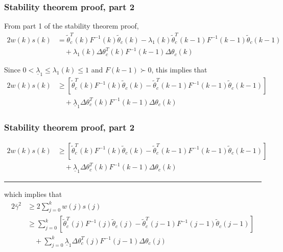 \begin{frame}
    \frametitle{Stability theorem proof, part 2}

    From part 1 of the stability theorem proof,
    \begin{align*}
        2 w(k) s(k) & = \tilde{\theta}_c^T(k) F^{-1}(k) \tilde{\theta}_c(k)
            - \lambda_1(k) \tilde{\theta}_c^T(k-1) F^{-1}(k-1) \tilde{\theta}_c(k-1) \\
        & \quad + \lambda_1(k) \Delta\theta_c^T(k) F^{-1}(k-1) \Delta\theta_c(k)
    \end{align*}
    \pause

    Since $0 < \underline{\lambda}_1 \leq \lambda_1(k) \leq 1$ and $F(k-1) \succ 0$, this implies that
    \begin{align*}
         2 w(k) s(k) & \geq \left[ \tilde{\theta}_c^T(k) F^{-1}(k) \tilde{\theta}_c(k)
            - \tilde{\theta}_c^T(k-1) F^{-1}(k-1) \tilde{\theta}_c(k-1) \right] \\
         & \quad + \underline{\lambda}_1 \Delta\theta_c^T(k) F^{-1}(k-1) \Delta\theta_c(k)
    \end{align*}
        
\end{frame}

\begin{frame}
    \frametitle{Stability theorem proof, part 2}    
    
    \begin{align*}
         2 w(k) s(k) & \geq \left[ \tilde{\theta}_c^T(k) F^{-1}(k) \tilde{\theta}_c(k)
            - \tilde{\theta}_c^T(k-1) F^{-1}(k-1) \tilde{\theta}_c(k-1) \right] \\
         & \quad + \underline{\lambda}_1 \Delta\theta_c^T(k) F^{-1}(k-1) \Delta\theta_c(k)
    \end{align*}
    \hrule{\hfill}
    
    which implies that
    \begin{align*}
        2 \bar{\gamma}^2 & \geq 2 \sum_{j=0}^k w(j) s(j) \\
        & \geq \sum_{j=0}^k \left[ \tilde{\theta}_c^T(j) F^{-1}(j) \tilde{\theta}_c(j)
            - \tilde{\theta}_c^T(j-1) F^{-1}(j-1) \tilde{\theta}_c(j-1) \right] \\
        & \quad + \sum_{j=0}^k \underline{\lambda}_1 \Delta \theta_c^T(j) F^{-1}(j-1) \Delta \theta_c(j)
    \end{align*}
\end{frame}

